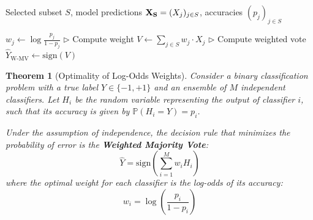 \documentclass{article}
\theoremstyle{plain}
\newtheorem{theorem}{Theorem}[section]
\theoremstyle{definition}
\theoremstyle{remark}
\begin{document}
\begin{algorithm}[ht]
\caption{Weighted Majority Voting (W-MV) Aggregation}
\label{alg:wmv}
\begin{algorithmic}[1]
\REQUIRE Selected subset $S$, model predictions ${ \bf X_S} = (X_j)_{j \in S}$, accuracies $(p_j)_{j \in S}$ 
    
    \STATE $w_j \leftarrow \log \frac{p_j}{1 - p_j}$  \hfill $\triangleright$ Compute weight 
\ENDFOR
\STATE $V \leftarrow \sum_{j \in S} w_j \cdot X_j$ \hfill $\triangleright$ Compute weighted vote
\STATE $\hat{Y}_{\text{W-MV}} \leftarrow \text{sign}(V)$
\end{algorithmic}
\end{algorithm}
\begin{theorem}[Optimality of Log-Odds Weights]
\label{thm:logodd}
Consider a binary classification problem with a true label $Y \in \{-1, +1\}$ and an ensemble of $M$ independent classifiers. Let $H_i$ be the random variable representing the output of classifier $i$, such that its accuracy is given by $\mathbb{P}(H_i = Y) = p_i$.

Under the assumption of independence, the decision rule that minimizes the probability of error is the \textbf{Weighted Majority Vote}:
\[
\hat{Y} = \mathrm{sign}\left( \sum_{i=1}^{M} w_i H_i \right)
\]
where the optimal weight for each classifier is the log-odds of its accuracy:
\[
w_i = \log\left(\frac{p_i}{1 - p_i}\right)
\]
\end{theorem}
\end{document}
